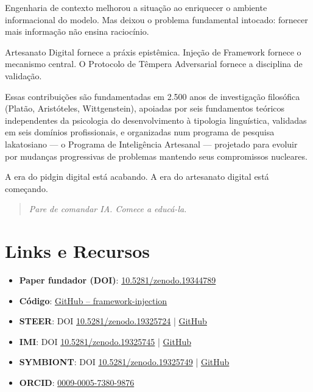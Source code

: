 \documentclass[12pt,a4paper]{article}
\begin{document}
Engenharia de contexto melhorou a situação ao enriquecer o ambiente informacional do modelo. Mas deixou o problema fundamental intocado: fornecer mais informação não ensina raciocínio.

Artesanato Digital fornece a práxis epistêmica. Injeção de Framework fornece o mecanismo central. O Protocolo de Têmpera Adversarial fornece a disciplina de validação.

Essas contribuições são fundamentadas em 2.500 anos de investigação filosófica (Platão, Aristóteles, Wittgenstein), apoiadas por seis fundamentos teóricos independentes da psicologia do desenvolvimento à tipologia linguística, validadas em seis domínios profissionais, e organizadas num programa de pesquisa lakatosiano --- o Programa de Inteligência Artesanal --- projetado para evoluir por mudanças progressivas de problemas mantendo seus compromissos nucleares.

A era do pidgin digital está acabando. A era do artesanato digital está começando.

\begin{quote}
\emph{Pare de comandar IA. Comece a educá-la.}
\end{quote}

\section*{Links e Recursos}

\begin{itemize}
  \item \textbf{Paper fundador (DOI)}: \href{https://doi.org/10.5281/zenodo.19344789}{10.5281/zenodo.19344789}
  \item \textbf{Código}: \href{https://github.com/RAG7782/framework-injection}{GitHub -- framework-injection}
  \item \textbf{STEER}: DOI \href{https://doi.org/10.5281/zenodo.19325724}{10.5281/zenodo.19325724} | \href{https://github.com/RAG7782/steer}{GitHub}
  \item \textbf{IMI}: DOI \href{https://doi.org/10.5281/zenodo.19325745}{10.5281/zenodo.19325745} | \href{https://github.com/RAG7782/imi}{GitHub}
  \item \textbf{SYMBIONT}: DOI \href{https://doi.org/10.5281/zenodo.19325749}{10.5281/zenodo.19325749} | \href{https://github.com/RAG7782/symbiont}{GitHub}
  \item \textbf{ORCID}: \href{https://orcid.org/0009-0005-7380-9876}{0009-0005-7380-9876}
\end{itemize}
\end{document}
